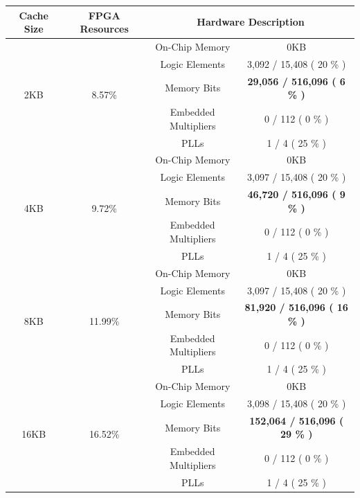 \documentclass{article}
\begin{document}
\begin{table}[H]
  \centering
    \begin{tabular}{|c|c|c|c|}
    \hline
    \textbf{Cache Size} & \textbf{FPGA Resources } & \multicolumn{2}{c|}{\textbf{Hardware Description}} \\\hline
    \multirow{5}{*}{2KB} & \multirow{5}{*}{8.57\%} & On-Chip Memory & 0KB \\
\cline{3-4}          &       & Logic Elements & 3,092 / 15,408 ( 20 \% ) \\
\cline{3-4}          &       & Memory Bits & \textbf{29,056 / 516,096 ( 6 \% )} \\
\cline{3-4}          &       & Embedded Multipliers & 0 / 112 ( 0 \% ) \\
\cline{3-4}          &       & PLLs  & 1 / 4 ( 25 \% ) \\
    \hline
    \multirow{5}{*}{4KB} & \multirow{5}{*}{9.72\%} & On-Chip Memory & 0KB \\
\cline{3-4}          &       & Logic Elements & 3,097 / 15,408 ( 20 \% ) \\
\cline{3-4}          &       & Memory Bits & \textbf{46,720 / 516,096 ( 9 \% )} \\
\cline{3-4}          &       & Embedded Multipliers & 0 / 112 ( 0 \% ) \\
\cline{3-4}          &       & PLLs  & 1 / 4 ( 25 \% ) \\
    \hline
    \multirow{5}{*}{8KB} & \multirow{5}{*}{11.99\%} & On-Chip Memory & 0KB \\
\cline{3-4}          &       & Logic Elements & 3,097 / 15,408 ( 20 \% ) \\
\cline{3-4}          &       & Memory Bits & \textbf{81,920 / 516,096 ( 16 \% )} \\
\cline{3-4}          &       & Embedded Multipliers & 0 / 112 ( 0 \% ) \\
\cline{3-4}          &       & PLLs  & 1 / 4 ( 25 \% ) \\
    \hline
    \multirow{5}{*}{16KB} & \multirow{5}{*}{16.52\%} & On-Chip Memory & 0KB \\
\cline{3-4}          &       & Logic Elements & 3,098 / 15,408 ( 20 \% ) \\
\cline{3-4}          &       & Memory Bits & \textbf{152,064 / 516,096 ( 29 \% )} \\
\cline{3-4}          &       & Embedded Multipliers & 0 / 112 ( 0 \% ) \\
\cline{3-4}          &       & PLLs  & 1 / 4 ( 25 \% ) \\

\end{tabular}
\end{table}
\end{document}
